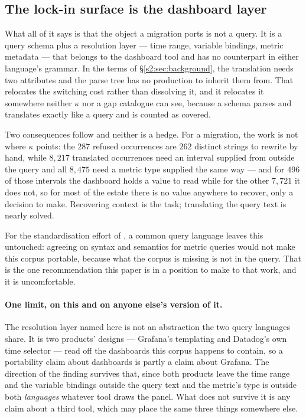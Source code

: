 \subsection{The lock-in surface is the dashboard layer}
\label{s2:sec:dashboard-layer}

What all of it says is that the object a migration ports is not a query. It is a query
schema plus a resolution layer --- time range, variable bindings, metric metadata --- that
belongs to the dashboard tool and has no counterpart in either language's grammar. In the
terms of \S\ref{s2:sec:background}, the translation needs two attributes and the parse tree
has no production to inherit them from. That relocates the switching cost rather than
dissolving it, and it relocates it somewhere neither $\kappa$ nor a gap catalogue can see,
because a schema parses and translates exactly like a query and is counted as covered.

Two consequences follow and neither is a hedge. For a migration, the work is not where
$\kappa$ points: the $287$ refused occurrences are $262$ distinct strings to rewrite by
hand, while $8{,}217$ translated occurrences need an interval supplied from outside the
query and all $8{,}475$ need a metric type supplied the same way --- and for $496$ of those
intervals the dashboard holds a value to read while for the other $7{,}721$ it does not, so
for most of the estate there is no value anywhere to recover, only a decision to make.
Recovering context is the task; translating the query text is nearly solved.

For the standardisation effort of \citet{sharma2025}, a common query language leaves this
untouched: agreeing on syntax and semantics for metric queries would not make this corpus
portable, because what the corpus is missing is not in the query. That is the one
recommendation this paper is in a position to make to that work, and it is uncomfortable.

\paragraph{One limit, on this and on anyone else's version of it.}
The resolution layer named here is not an abstraction the two query languages share. It is
two products' designs --- Grafana's templating and Datadog's own time selector --- read off
the dashboards this corpus happens to contain, so a portability claim about dashboards is
partly a claim about Grafana. The direction of the finding survives that, since both
products leave the time range and the variable bindings outside the query text and the
metric's type is outside both \emph{languages} whatever tool draws the panel. What does not
survive it is any claim about a third tool, which may place the same three things somewhere
else.
